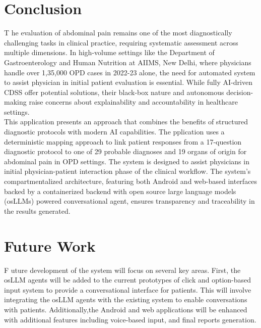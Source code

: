 \section{Conclusion}
\lettrine{T}{ }he evaluation of abdominal pain remains one of the most diagnostically challenging tasks in clinical practice, requiring systematic assessment across multiple dimensions. In high-volume settings like the Department of Gastroenterology and Human Nutrition at AIIMS, New Delhi, where physicians handle over 1,35,000 OPD cases in 2022-23 alone, the need for automated system to assist physician in initial patient evaluation is essential. While fully AI-driven CDSS offer potential solutions, their black-box nature and autonomous decision-making raise concerns about explainability and accountability in healthcare settings.\\[\baselineskip]

\noindent This application presents an approach that combines the benefits of structured diagnostic protocols with modern AI capabilities. The pplication uses a deterministic mapping approach to link patient responses from a 17-question diagnostic protocol to one of 29 probable diagnoses and 19 organs of origin for abdominal pain in OPD settings. The system is designed to assist physicians in initial physician-patient interaction phase of the clinical workflow. The system's compartmentalized architecture, featuring both Android and web-based interfaces backed by a containerized backend with open source large language models (osLLMs) powered conversational agent, ensures transparency and traceability in the results generated.\\[\baselineskip]


\section{Future Work}
\lettrine{F}{ }uture development of the system will focus on several key areas. First, the osLLM agents will be added to the current prototypes of click and option-based input system to provide a conversational interface for patients. This will involve integrating the osLLM agents with the existing system to enable conversations with patients. Additionally,the Android and web applications will be enhanced with additional features including voice-based input, and final reports generation.\\[\baselineskip]

